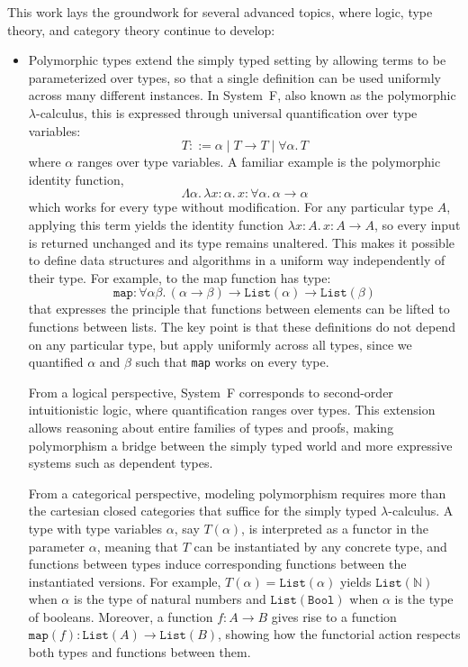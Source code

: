 This work lays the groundwork for several advanced topics, where logic, type theory, and category theory continue to develop:

\begin{itemize}
\item Polymorphic types extend the simply typed setting by allowing terms to be parameterized over types, so that a single definition can be used uniformly across many different instances. In System~F, also known as the polymorphic $\lambda$-calculus, this is expressed through universal quantification over type variables:
  \[
    T ::= \alpha \mid T \to T \mid \forall \alpha.\,T
  \]
  where $\alpha$ ranges over type variables. A familiar example is the polymorphic identity function,
  \[
    \Lambda \alpha.\,\lambda x:\alpha.\,x : \forall \alpha.\,\alpha \to \alpha
  \]
  which works for every type without modification. For any particular type $A$, applying this term yields the identity function $\lambda x:A.\,x : A \to A$, so every input is returned unchanged and its type remains unaltered. This makes it possible to define data structures and algorithms in a uniform way independently of their type. For example, to the map function has type:
  \[
    \texttt{map} : \forall \alpha \beta.\,(\alpha \to \beta) \to \texttt{List}(\alpha) \to \texttt{List}(\beta)
  \]
  that expresses the principle that functions between elements can be lifted to functions between lists. The key point is that these definitions do not depend on any particular type, but apply uniformly across all types, since we quantified $\alpha$ and $\beta$ such that \texttt{map} works on every type. 

  From a logical perspective, System~F corresponds to second-order intuitionistic logic, where quantification ranges over types. This extension allows reasoning about entire families of types and proofs, making polymorphism a bridge between the simply typed world and more expressive systems such as dependent types.

  From a categorical perspective, modeling polymorphism requires more than the cartesian closed categories that suffice for the simply typed $\lambda$-calculus. A type with type variables $\alpha$, say $T(\alpha)$, is interpreted as a functor in the parameter $\alpha$, meaning that $T$ can be instantiated by any concrete type, and functions between types induce corresponding functions between the instantiated versions. For example, $T(\alpha) = \texttt{List}(\alpha)$ yields $\texttt{List}(\mathbb{N})$ when $\alpha$ is the type of natural numbers and $\texttt{List}(\texttt{Bool})$ when $\alpha$ is the type of booleans. Moreover, a function $f : A \to B$ gives rise to a function $\texttt{map}(f) : \texttt{List}(A) \to \texttt{List}(B)$, showing how the functorial action respects both types and functions between them.
  

\end{itemize}
